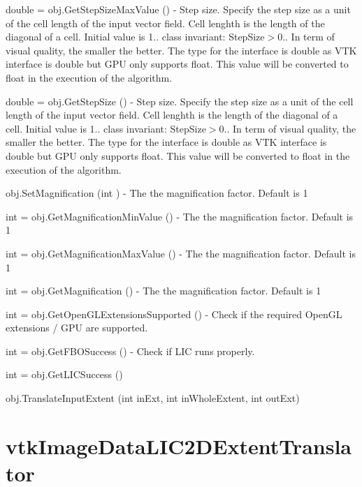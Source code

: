 \begin{DoxyItemize}
\item {\ttfamily double = obj.\-Get\-Step\-Size\-Max\-Value ()} -\/ Step size. Specify the step size as a unit of the cell length of the input vector field. Cell lenghth is the length of the diagonal of a cell. Initial value is 1.. class invariant\-: Step\-Size$>$0.. In term of visual quality, the smaller the better. The type for the interface is double as V\-T\-K interface is double but G\-P\-U only supports float. This value will be converted to float in the execution of the algorithm.  
\item {\ttfamily double = obj.\-Get\-Step\-Size ()} -\/ Step size. Specify the step size as a unit of the cell length of the input vector field. Cell lenghth is the length of the diagonal of a cell. Initial value is 1.. class invariant\-: Step\-Size$>$0.. In term of visual quality, the smaller the better. The type for the interface is double as V\-T\-K interface is double but G\-P\-U only supports float. This value will be converted to float in the execution of the algorithm.  
\item {\ttfamily obj.\-Set\-Magnification (int )} -\/ The the magnification factor. Default is 1  
\item {\ttfamily int = obj.\-Get\-Magnification\-Min\-Value ()} -\/ The the magnification factor. Default is 1  
\item {\ttfamily int = obj.\-Get\-Magnification\-Max\-Value ()} -\/ The the magnification factor. Default is 1  
\item {\ttfamily int = obj.\-Get\-Magnification ()} -\/ The the magnification factor. Default is 1  
\item {\ttfamily int = obj.\-Get\-Open\-G\-L\-Extensions\-Supported ()} -\/ Check if the required Open\-G\-L extensions / G\-P\-U are supported.  
\item {\ttfamily int = obj.\-Get\-F\-B\-O\-Success ()} -\/ Check if L\-I\-C runs properly.  
\item {\ttfamily int = obj.\-Get\-L\-I\-C\-Success ()}  
\item {\ttfamily obj.\-Translate\-Input\-Extent (int in\-Ext, int in\-Whole\-Extent, int out\-Ext)}  
\end{DoxyItemize}\hypertarget{vtkhybrid_vtkimagedatalic2dextenttranslator}{}\section{vtk\-Image\-Data\-L\-I\-C2\-D\-Extent\-Translator}\label{vtkhybrid_vtkimagedatalic2dextenttranslator}

